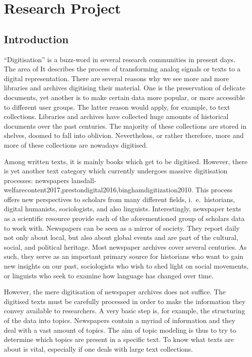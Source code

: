 \section{Research Project}
\subsection{Introduction}
``Digitisation'' is a buzz-word in several research communities in present days. The area of  It describes the process of transforming analog signals or texts to a digital representation. There are several reasons why we see more and more libraries and archives digitising their material. One is the preservation of delicate documents, yet another is to make certain data more popular, or more accessible to different user groups. The latter reason would apply, for example, to text collections. Libraries and archives have collected huge amounts of historical documents over the past centuries. The majority of these collections are stored in shelves, doomed to fall into oblivion. Nevertheless, or rather therefore, more and more of these collections are nowadays digitised.

Among written texts, it is mainly books which get to be digitised. However, there is yet another text category which currently undergoes massive digitisation processes: newspapers lansdall-welfarecontent2017,prestondigital2016,binghamdigitization2010. This process offers new perspectives to scholars from many different fields, i.~e.~historians, digital humanists, sociologists, and also linguists. Interestingly, newspaper texts as a scientific resource provide each of the aforementioned group of scholars data to work with. Newspapers can be seen as a mirror of society. They report daily not only about local, but also about global events and are part of the cultural, social, and political heritage. Most newspaper archives cover several centuries. As such, they serve as an important primary source for historians who want to gain new insights on our past, sociologists who wish to shed light on social movements, or linguists who seek to examine how language has changed over time.

However, the mere digitisation of newspaper archives does not suffice. The digitised texts must be carefully processed in order to make the information they convey available to researchers. A very basic step is, for example, the structuring of the data into topics. Newspapers contain a myriad of information and they deal with a vast amount of topics. The aim of topic modeling is thus to try to determine which topics are present in a specific text. To know what texts are about is vital, especially if one deals with large text collections.

